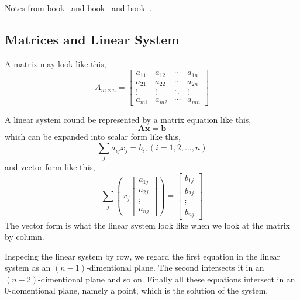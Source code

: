 %


Notes from book~\cite{bib:linear2} and book~\cite{bib:linalgmit} and book~\cite{bib:matana}.

\subsection{Matrices and Linear System}

A matrix may look like this,
$$
A_{m\times n} = 
\begin{bmatrix}
  a_{11} & a_{12} & \cdots & a_{1n} \\
  a_{21} & a_{22} & \cdots & a_{2n} \\
  \vdots & \vdots & \ddots & \vdots \\
  a_{m1} & a_{m2} & \cdots & a_{mn}
\end{bmatrix}
$$

A linear system cound be represented by a matrix equation like this,
$$ \mathbf{A}\mathbf{x} = \mathbf{b} $$
which can be expanded into scalar form like this,
$$ \sum_j a_{ij} x_j = b_i, (i = 1,2,\ldots, n) $$
and vector form like this,
$$ \sum_j (x_j \begin{bmatrix}a_{1j}\\a_{2j}\\\vdots\\a_{nj}\end{bmatrix})
	= \begin{bmatrix}b_{1j}\\b_{2j}\\\vdots\\b_{nj}\end{bmatrix} $$
The vector form is what the linear system look like when we look at
the matrix by column. 

Inspecing the linear system by row, we regard the first equation in
the linear system as an $(n-1)$-dimentional plane. The second intersects
it in an $(n-2)$-dimentional plane and so on. Finally all these equations
intersect in an $0$-domentional plane, namely a point, which is the
solution of the system.

